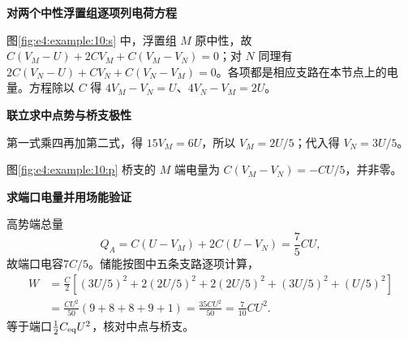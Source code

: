 \begin{solution}\textbf{对两个中性浮置组逐项列电荷方程}\par\nobreak
图\ref{fig:e4:example:10:s} 中，浮置组 $M$ 原中性，故 $C(V_M-U)+2CV_M+C(V_M-V_N)=0$；对 $N$ 同理有 $2C(V_N-U)+CV_N+C(V_N-V_M)=0$。各项都是相应支路在本节点上的电量。方程除以 $C$ 得 $4V_M-V_N=U$、$4V_N-V_M=2U$。

\par\medskip{}\noindent\textbf{联立求中点势与桥支极性}\par\nobreak
第一式乘四再加第二式，得 $15V_M=6U$，所以 $V_M=2U/5$；代入得 $V_N=3U/5$。

图\ref{fig:e4:example:10:p} 桥支的 $M$ 端电量为 $C(V_M-V_N)=-CU/5$，并非零。

\par\medskip{}\noindent\textbf{求端口电量并用场能验证}\par\nobreak
高势端总量
\[
 Q_A=C(U-V_M)+2C(U-V_N)=\frac75CU,
\]
故端口电容$7C/5$。储能按图中五条支路逐项计算，
\[
\begin{aligned}
W&=\frac C2\left[(3U/5)^2+2(2U/5)^2
+2(2U/5)^2+(3U/5)^2+(U/5)^2\right]\\
&=\frac{CU^2}{50}(9+8+8+9+1)
=\frac{35CU^2}{50}=\frac7{10}CU^2.
\end{aligned}
\]
等于端口$\tfrac12C_{\rm eq}U^2$，核对中点与桥支。\end{solution}

